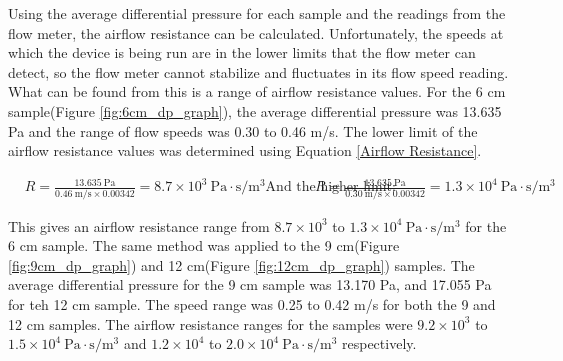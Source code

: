 	Using the average differential pressure for each sample and the readings from the 
flow meter, the airflow resistance can be calculated. Unfortunately, the speeds at which the 
device is being run are in the lower limits that the flow meter can detect, so the flow meter 
cannot stabilize and fluctuates in its flow speed reading. What can be found from this is a 
range of airflow resistance values. For the 6 cm sample(Figure \ref{fig:6cm_dp_graph}), the 
average differential pressure was 13.635 Pa and the range of flow speeds was 0.30 to 0.46 
m/s. The lower limit of the airflow resistance values was determined using Equation 
\ref{Airflow Resistance}. 

\begin{align}
  &R = \frac{13.635\ \mathrm{Pa}}{0.46\ \mathrm{m/s} \times 0.00342} = 8.7 \times 10^3\ 
  \mathrm{Pa\cdot s/m^3}
  \text{And the higher limit:}
  &R = \frac{13.635\ \mathrm{Pa}}{0.30\ \mathrm{m/s} \times 0.00342} = 1.3 \times 10^4\ 
  \mathrm{Pa\cdot s/m^3} 
\end{align}

This gives an airflow resistance range from $8.7 \times 10^3$ to $1.3 \times 10^4\ 
\mathrm{Pa\cdot s/m^3}$ for the 6 cm sample.
	The same method was applied to the 9 cm(Figure \ref{fig:9cm_dp_graph}) and 12 
cm(Figure \ref{fig:12cm_dp_graph}) samples. The average differential pressure for the 9 cm 
sample was 13.170 Pa, and 17.055 Pa for teh 12 cm sample. The speed range was 0.25 to 0.42 
m/s for both the 9 and 12 cm samples. The airflow resistance ranges for the samples were $9.2 
\times 10^3$ to $1.5 \times 10^4\ \mathrm{Pa\cdot s/m^3}$ and $1.2 \times 10^4$ to $2.0 
\times 10^4\ \mathrm{Pa\cdot s/m^3}$ respectively.

 
